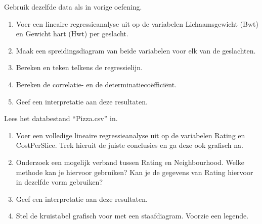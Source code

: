 \begin{exercise}
	Gebruik dezelfde data als in vorige oefening.
		\begin{enumerate}
		\item Voer een lineaire regressieanalyse uit op de variabelen Lichaamsgewicht (Bwt) en Gewicht hart (Hwt) per geslacht.
		\item Maak een spreidingsdiagram van beide variabelen voor elk van de geslachten.
		\item Bereken en teken telkens de regressielijn.
		\item Bereken de correlatie- en de determinatiecoëfficiënt.
		\item Geef een interpretatie aan deze resultaten.
	\end{enumerate}
\end{exercise}

\begin{exercise}
	Lees het databestand ``Pizza.csv'' in.
		\begin{enumerate}
		\item Voer een volledige lineaire regressieanalyse uit op de variabelen Rating en CostPerSlice. Trek hieruit de juiste conclusies en ga deze ook grafisch na.
		\item Onderzoek een mogelijk verband tussen Rating en Neighbourhood. Welke methode kan je hiervoor gebruiken? Kan je de gegevens van Rating hiervoor in dezelfde vorm gebruiken?
		\item Geef een interpretatie aan deze resultaten.
		\item Stel de kruistabel grafisch voor met een staafdiagram.  Voorzie een legende.
	\end{enumerate}
\end{exercise}